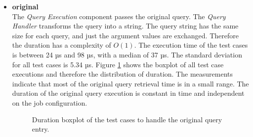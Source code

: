\documentclass[draft,final]{vutinfth} %
\begin{document}
\begin{itemize}
	\item \textbf{original} \\
	The \textit{Query Execution} component passes the original query. The \textit{Query Handler} transforms the query into a string. The query string has the same size for each query, and just the argument values are exchanged. Therefore the duration has a complexity of $O(1)$. The execution time of the test cases is between 24 µs and 98 µs, with a median of 37 µs. The standard deviation for all test cases is 5.34 µs. Figure \ref{fig:evaluation_perf_original} shows the boxplot of all test case executions and therefore the distribution of duration. The measurements indicate that most of the original query retrieval time is in a small range. The duration of the original query execution is constant in time and independent on the job configuration. 
	\begin{figure}[!h]
		\centering
		\caption{Duration boxplot of the test cases to handle the original query entry.}
		\label{fig:evaluation_perf_original}
	\end{figure}


\end{itemize}
\end{document}
